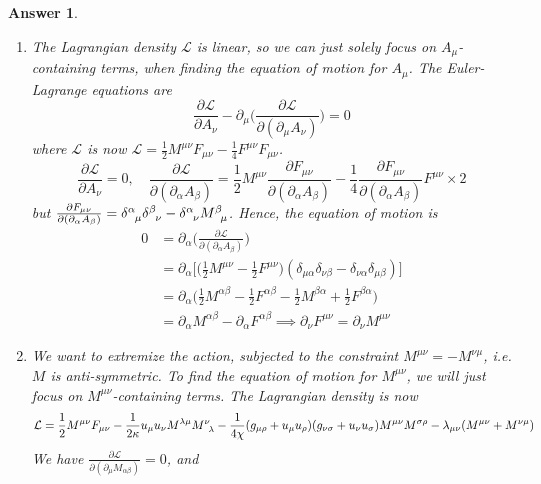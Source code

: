 \documentclass[a4paper]{article}
\newtheorem{ans}{Answer}[section]
\theoremstyle{new}
\begin{document}
\begin{ans}\leavevmode
\begin{enumerate}[label=(\alph*)]
\item The Lagrangian density $\mathcal{L}$ is linear, so we can just solely focus on $A_\mu$-containing terms, when finding the equation of motion for $A_\mu$. The Euler-Lagrange equations are
$$\frac{\partial\mathcal{L}}{\partial A_\nu}-\partial_\mu\bigg(\frac{\partial\mathcal{L}}{\partial(\partial_\mu A_\nu)}\bigg)=0$$
where $\mathcal{L}$ is now $\mathcal{L}=\frac{1}{2}M^{\mu\nu}F_{\mu\nu}-\frac{1}{4}F^{\mu\nu}F_{\mu\nu}$.
$$\frac{\partial\mathcal{L}}{\partial A_\nu}=0,\quad\frac{\partial\mathcal{L}}{\partial(\partial_\alpha A_\beta)}=\frac{1}{2}M^{\mu\nu}\frac{\partial F_{\mu\nu}}{\partial(\partial_\alpha A_\beta)}-\frac{1}{4}\frac{\partial F_{\mu\nu}}{\partial(\partial_\alpha A_\beta)}F^{\mu\nu}\times 2$$
but $\frac{\partial F_{\mu\nu}}{\partial(\partial_\alpha A_\beta)}=\tensor*{\delta}{*_{}^{\alpha}_{\mu}}\tensor*{\delta}{*_{}^{\beta}_{\nu}}-\tensor*{\delta}{*_{}^{\alpha}_{\nu}}\tensor*{M}{*_{}^{\beta}_{\mu}}$. Hence, the equation of motion is
\begin{align}
    0&=\partial_\alpha\bigg(\frac{\partial\mathcal{L}}{\partial(\partial_\alpha A_\beta)}\bigg)\nonumber\\&=\partial_\alpha\bigg[\bigg(\frac{1}{2}M^{\mu\nu}-\frac{1}{2}F^{\mu\nu}\bigg)(\delta_{\mu\alpha}\delta_{\nu\beta}-\delta_{\nu\alpha}\delta_{\mu\beta})\bigg]\nonumber\\&=\partial_\alpha\bigg(\frac{1}{2}M^{\alpha\beta}-\frac{1}{2}F^{\alpha\beta}-\frac{1}{2}M^{\beta\alpha}+\frac{1}{2}F^{\beta\alpha}\bigg)\nonumber\\&=\partial_\alpha M^{\alpha\beta}-\partial_\alpha F^{\alpha\beta}\nonumber\implies\partial_\nu F^{\mu\nu}=\partial_\nu M^{\mu\nu}\nonumber
\end{align}
\item We want to extremize the action, subjected to the constraint $M^{\mu\nu}=-M^{\nu\mu}$, i.e. $M$ is anti-symmetric. To find the equation of motion for $M^{\mu\nu}$, we will just focus on $M^{\mu\nu}$-containing terms. The Lagrangian density is now
$$\mathcal{L}=\frac{1}{2}M^{\mu\nu}F_{\mu\nu}-\frac{1}{2\kappa}u_\mu u_\nu M^{\lambda\mu}\tensor*{M}{*_{}^{\nu}_{\lambda}}-\frac{1}{4\chi}(g_{\mu\rho}+u_\mu u_\rho)(g_{\nu\sigma}+u_\nu u_\sigma)M^{\mu\nu}M^{\sigma\rho}-\lambda_{\mu\nu}(M^{\mu\nu}+M^{\nu\mu})$$
We have $\frac{\partial\mathcal{L}}{\partial(\partial_\mu M_{\alpha\beta})}=0$, and
\begin{eqnarray}

\end{eqnarray}
\end{enumerate}
\end{ans}
\end{document}
